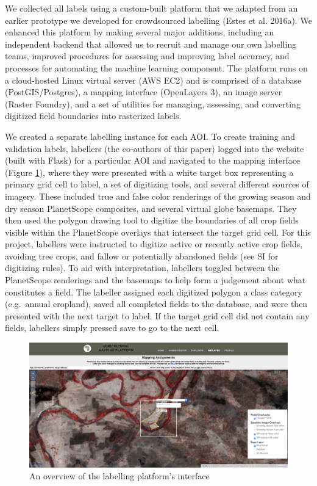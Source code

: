 \documentclass[11pt,a4paper]{article}
\begin{document}
We collected all labels using a custom-built platform that we adapted
from an earlier prototype we developed for crowdsourced labelling (Estes
et al. 2016a). We enhanced this platform by making several major
additions, including an independent backend that allowed us to recruit
and manage our own labelling teams, improved procedures for assessing
and improving label accuracy, and processes for automating the machine
learning component. The platform runs on a cloud-hosted Linux virtual
server (AWS EC2) and is comprised of a database (PostGIS/Postgres), a
mapping interface (OpenLayers 3), an image server (Raster Foundry), and
a set of utilities for managing, assessing, and converting digitized
field boundaries into rasterized labels.

We created a separate labelling instance for each AOI. To create
training and validation labels, labellers (the co-authors of this paper)
logged into the website (built with Flask) for a particular AOI and
navigated to the mapping interface (Figure \ref{fig:labeller}), where
they were presented with a white target box representing a primary grid
cell to label, a set of digitizing tools, and several different sources
of imagery. These included true and false color renderings of the
growing season and dry season PlanetScope composites, and several
virtual globe basemaps. They then used the polygon drawing tool to
digitize the boundaries of all crop fields visible within the
PlanetScope overlays that intersect the target grid cell. For this
project, labellers were instructed to digitize active or recently active
crop fields, avoiding tree crops, and fallow or potentially abandoned
fields (see SI for digitizing rules). To aid with interpretation,
labellers toggled between the PlanetScope renderings and the basemaps to
help form a judgement about what constitutes a field. The labeller
assigned each digitized polygon a class category (e.g.~annual cropland),
saved all completed fields to the database, and were then presented with
the next target to label. If the target grid cell did not contain any
fields, labellers simply pressed save to go to the next cell.

\begin{figure}

{\centering \includegraphics[width=0.95\linewidth]{figures/figure2} 

}

\caption{An overview of the labelling platform's interface}\label{fig:labeller}
\end{figure}
\end{document}
